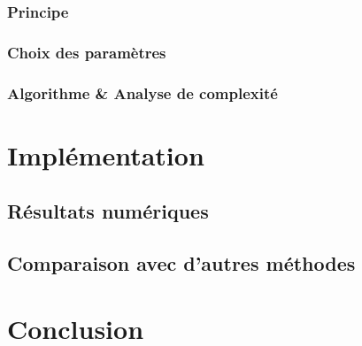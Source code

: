 \documentclass[a4paper]{article} %
\numberwithin{equation}{section}
\begin{document}
\subsubsection{Principe}

\subsubsection{Choix des paramètres}

\subsubsection{Algorithme \& Analyse de complexité}

\section{Implémentation}
\subsection{Résultats numériques}

\subsection{Comparaison avec d'autres méthodes}

\section{Conclusion}
\end{document}
